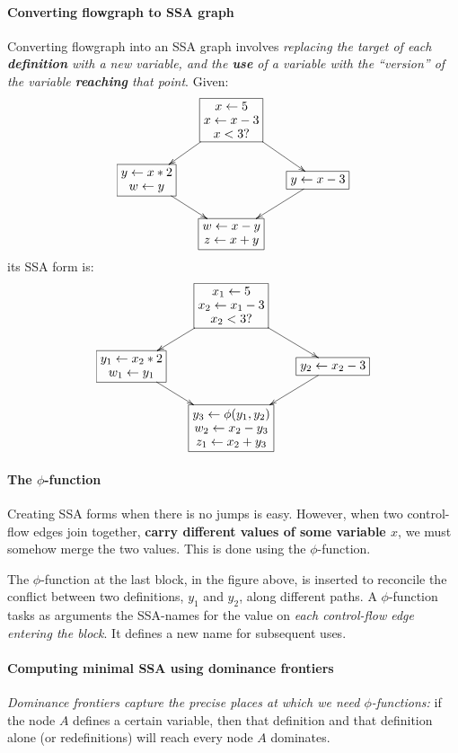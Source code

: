 \documentclass{memo}
\begin{document}
\paragraph{Converting flowgraph to SSA graph} Converting flowgraph into an SSA
graph involves {\em replacing the target of each {\bfseries definition}
  with a new variable, and the {\bfseries use} of a variable with the
  ``version'' of the variable   {\bfseries reaching} that point\/}. Given:
\[\xymatrix@-0.5pc{
  & *+[F]\txt{$x \leftarrow 5$ \\ $x \leftarrow x - 3$ \\ $x <
    3?$}\ar[rd]\ar[ld]& \\
*+[F]\txt{$y \leftarrow x * 2$ \\ $w \leftarrow y$ } \ar[rd]&& *+[F]\txt{$y
  \leftarrow x-3$} \ar[ld]\\
& *+[F]\txt{$w \leftarrow x - y$ \\ $z \leftarrow x + y$} &
}\]
its SSA form is:
\[\xymatrix@-0.5pc{
  & *+[F]\txt{$x_1 \leftarrow 5$ \\ $x_2 \leftarrow x_1 - 3$ \\ $x_2 <
    3?$}\ar[rd]\ar[ld]& \\
*+[F]\txt{$y_1 \leftarrow x_2 * 2$ \\ $w_1 \leftarrow y_1$ } \ar[rd]&& *+[F]\txt{$y_2 \leftarrow x_2-3$} \ar[ld]\\
& *+[F]\txt{$y_3 \leftarrow \phi(y_1, y_2)$\\ $w_2 \leftarrow x_2 - y_3$ \\ $z_1 \leftarrow x_2 + y_3$} &
}\]

\paragraph{The $\phi$-function}
Creating SSA forms when there is no jumps is easy. However, when two
control-flow edges join together, {\bf carry different values of some variable
  $x$}, we must somehow merge the two values. This is done using  the
$\phi$-function. 

The $\phi$-function at the last block, in the figure above, is inserted to
reconcile the conflict between two definitions, $y_1$ and $y_2$, along
different paths.  A $\phi$-function tasks as arguments the SSA-names for the
value on {\em each   control-flow edge entering the block\/}. It defines a new
name for subsequent uses. 

\paragraph{Computing minimal SSA using dominance frontiers}
{\em Dominance frontiers capture the precise places at which we need
$\phi$-functions:\/} if the node $A$ defines a certain variable, then that
definition and that definition alone (or redefinitions) will reach every node
$A$ dominates. 
\end{document}
